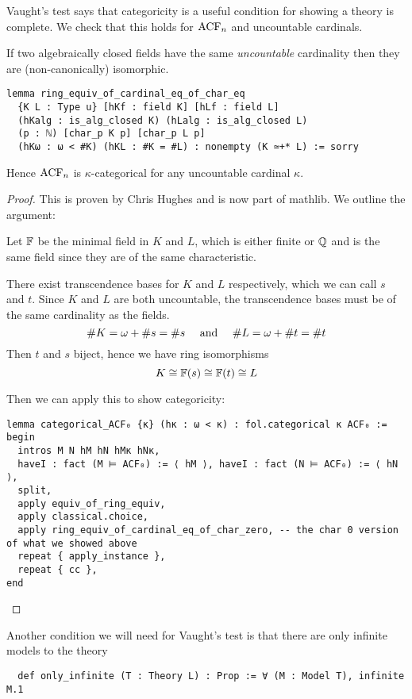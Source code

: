 Vaught's test says that categoricity is a useful condition for showing a theory is complete.
We check that this holds for $\operatorname{ACF}_{n}$ and uncountable cardinals.
\begin{prop}
  If two algebraically closed fields have the same \textit{uncountable}
  cardinality then they are (non-canonically) isomorphic.
  \begin{lstlisting}
lemma ring_equiv_of_cardinal_eq_of_char_eq
  {K L : Type u} [hKf : field K] [hLf : field L]
  (hKalg : is_alg_closed K) (hLalg : is_alg_closed L)
  (p : ℕ) [char_p K p] [char_p L p]
  (hKω : ω < #K) (hKL : #K = #L) : nonempty (K ≃+* L) := sorry \end{lstlisting}

  Hence $\operatorname{ACF}_{n}$ is $\kappa$-categorical for any uncountable cardinal $\kappa$.
\end{prop}
\begin{proof}
  This is proven by Chris Hughes and is now part of mathlib.
  We outline the argument:

  Let $\mathbb{F}$ be the minimal field in $K$ and $L$,
  which is either finite or $\mathbb{Q}$
  and is the same field since they are of the same characteristic.

  There exist transcendence bases for $K$ and $L$ respectively,
  which we can call $s$ and $t$.
  Since $K$ and $L$ are both uncountable,
  the transcendence bases must be of the same cardinality as the fields.
  \[ \# K = \omega + \# s = \# s \quad \text{ and }
    \quad \# L = \omega + \# t = \# t \]
  Then $t$ and $s$ biject, hence we have ring isomorphisms
  \[K \cong \mathbb{F}(s) \cong \mathbb{F}(t) \cong L\]

  Then we can apply this to show categoricity:

\begin{lstlisting}
lemma categorical_ACF₀ {κ} (hκ : ω < κ) : fol.categorical κ ACF₀ :=
begin
  intros M N hM hN hMκ hNκ,
  haveI : fact (M ⊨ ACF₀) := ⟨ hM ⟩, haveI : fact (N ⊨ ACF₀) := ⟨ hN ⟩,
  split,
  apply equiv_of_ring_equiv,
  apply classical.choice,
  apply ring_equiv_of_cardinal_eq_of_char_zero, -- the char 0 version of what we showed above
  repeat { apply_instance },
  repeat { cc },
end\end{lstlisting}
\end{proof}

Another condition we will need for Vaught's test
is that there are only infinite models to the theory

\begin{lstlisting}
  def only_infinite (T : Theory L) : Prop := ∀ (M : Model T), infinite M.1\end{lstlisting}

